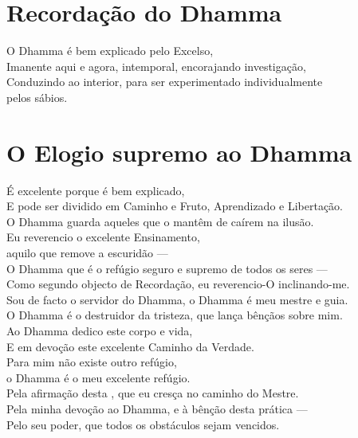 \clearpage

\chapter{Recordação do Dhamma}

\begin{leader}
\end{leader}

O Dhamma é bem explicado pelo Excelso,\\
Imanente aqui e agora, intemporal, encorajando investigação,\\
Conduzindo ao interior, para ser experimentado individualmente\\
\vin pelos sábios.

\nextChapterUseDelegatedPageNumber

\chapter{O Elogio supremo ao Dhamma}

\begin{leader}
\end{leader}

É excelente porque é bem explicado,\\
E pode ser dividido em Caminho e Fruto, Aprendizado e Libertação.\\
O Dhamma guarda aqueles que o mantêm de caírem na ilusão.\\
Eu reverencio o excelente Ensinamento,\\
\vin aquilo que remove a escuridão ---\\
O Dhamma que é o refúgio seguro e supremo de todos os seres ---\\
Como segundo objecto de Recordação, eu reverencio-O inclinando-me.\\
Sou de facto o servidor do Dhamma, o Dhamma é meu mestre e guia.\\
O Dhamma é o destruidor da tristeza, que lança bênçãos sobre mim.\\
Ao Dhamma dedico este corpo e vida,\\
E em devoção  este excelente Caminho da Verdade.\\
Para mim não existe outro refúgio,\\
\vin o Dhamma é o meu excelente refúgio.\\
Pela afirmação desta , que eu cresça no caminho do Mestre.\\
Pela minha devoção ao Dhamma, e à bênção desta prática ---\\
Pelo seu poder, que todos os obstáculos sejam vencidos.

